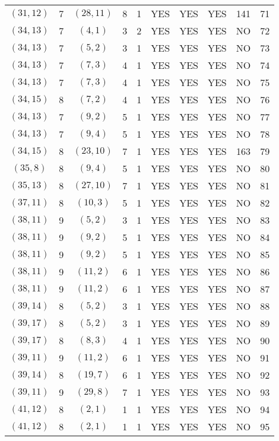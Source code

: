 \begin{longtable}{|c|c|c|c|c|c|c|c|c|c|}
$(31, 12)$ & 7 & $(28, 11)$ & 8 & 1 & YES & YES & YES & 141 & 71\\
$(34, 13)$ & 7 & $(4, 1)$ & 3 & 2 & YES & YES & YES & NO & 72\\
$(34, 13)$ & 7 & $(5, 2)$ & 3 & 1 & YES & YES & YES & NO & 73\\
$(34, 13)$ & 7 & $(7, 3)$ & 4 & 1 & YES & YES & YES & NO & 74\\
$(34, 13)$ & 7 & $(7, 3)$ & 4 & 1 & YES & YES & YES & NO & 75\\
$(34, 15)$ & 8 & $(7, 2)$ & 4 & 1 & YES & YES & YES & NO & 76\\
$(34, 13)$ & 7 & $(9, 2)$ & 5 & 1 & YES & YES & YES & NO & 77\\
$(34, 13)$ & 7 & $(9, 4)$ & 5 & 1 & YES & YES & YES & NO & 78\\
$(34, 15)$ & 8 & $(23, 10)$ & 7 & 1 & YES & YES & YES & 163 & 79\\
$(35, 8)$ & 8 & $(9, 4)$ & 5 & 1 & YES & YES & YES & NO & 80\\
$(35, 13)$ & 8 & $(27, 10)$ & 7 & 1 & YES & YES & YES & NO & 81\\
$(37, 11)$ & 8 & $(10, 3)$ & 5 & 1 & YES & YES & YES & NO & 82\\
$(38, 11)$ & 9 & $(5, 2)$ & 3 & 1 & YES & YES & YES & NO & 83\\
$(38, 11)$ & 9 & $(9, 2)$ & 5 & 1 & YES & YES & YES & NO & 84\\
$(38, 11)$ & 9 & $(9, 2)$ & 5 & 1 & YES & YES & YES & NO & 85\\
$(38, 11)$ & 9 & $(11, 2)$ & 6 & 1 & YES & YES & YES & NO & 86\\
$(38, 11)$ & 9 & $(11, 2)$ & 6 & 1 & YES & YES & YES & NO & 87\\
$(39, 14)$ & 8 & $(5, 2)$ & 3 & 1 & YES & YES & YES & NO & 88\\
$(39, 17)$ & 8 & $(5, 2)$ & 3 & 1 & YES & YES & YES & NO & 89\\
$(39, 17)$ & 8 & $(8, 3)$ & 4 & 1 & YES & YES & YES & NO & 90\\
$(39, 11)$ & 9 & $(11, 2)$ & 6 & 1 & YES & YES & YES & NO & 91\\
$(39, 14)$ & 8 & $(19, 7)$ & 6 & 1 & YES & YES & YES & NO & 92\\
$(39, 11)$ & 9 & $(29, 8)$ & 7 & 1 & YES & YES & YES & NO & 93\\
$(41, 12)$ & 8 & $(2, 1)$ & 1 & 1 & YES & YES & YES & NO & 94\\
$(41, 12)$ & 8 & $(2, 1)$ & 1 & 1 & YES & YES & YES & NO & 95\\

\end{longtable}
